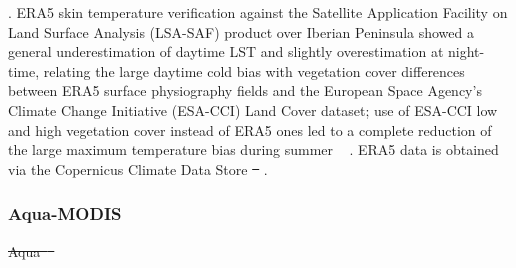 \documentclass[hess, twostagejnl]{copernicus}
\providecommand{\DIFadd}[1]{{\protect\color{blue}\uwave{#1}}} %
\providecommand{\DIFdel}[1]{{\protect\color{red}\sout{#1}}}                      %
\providecommand{\DIFaddbegin}{} %
\providecommand{\DIFaddend}{} %
\providecommand{\DIFdelbegin}{} %
\providecommand{\DIFdelend}{} %
\begin{document}
{{\citep{essd-13-4349-2021}}\hskip0pt%
. ERA5 skin temperature verification against the Satellite Application Facility on Land Surface Analysis (LSA-SAF) product over Iberian Peninsula showed a general underestimation of daytime LST and slightly overestimation at night-time, relating the large daytime cold bias with vegetation cover differences between ERA5 surface physiography fields and the European Space Agency’s Climate Change Initiative (ESA-CCI) Land Cover dataset; use of ESA-CCI low and high vegetation cover instead of ERA5 ones led to a complete reduction of the large maximum temperature bias during summer \mbox{%
\citep{Johannsen2019}}\hskip0pt%
. ERA5 }\DIFaddend data is obtained via the Copernicus Climate Data Store \DIFdelbegin \DIFdel{\mbox{%
\cite[CDS,][]{CDS}}\hskip0pt%
}\DIFdelend \DIFaddbegin \DIFadd{\mbox{%
\citep[CDS;][]{CDS}}\hskip0pt%
}\DIFaddend .


\subsubsection{Aqua-MODIS}

\DIFdelbegin \DIFdel{Aqua\mbox{%
\cite{aquaref} }\hskip0pt%
}\DIFdelend \DIFaddbegin 
\end{document}
